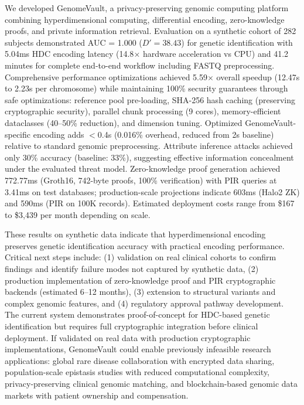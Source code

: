 \documentclass[11pt,letterpaper]{article}
\begin{document}
We developed GenomeVault, a privacy-preserving genomic computing platform combining hyperdimensional computing, differential encoding, zero-knowledge proofs, and private information retrieval. Evaluation on a synthetic cohort of 282 subjects demonstrated AUC = 1.000 ($D' = 38.43$) for genetic identification with 5.04ms HDC encoding latency (14.8$\times$ hardware acceleration vs CPU) and 41.2 minutes for complete end-to-end workflow including FASTQ preprocessing. Comprehensive performance optimizations achieved 5.59$\times$ overall speedup (12.47s to 2.23s per chromosome) while maintaining 100\% security guarantees through safe optimizations: reference pool pre-loading, SHA-256 hash caching (preserving cryptographic security), parallel chunk processing (9 cores), memory-efficient dataclasses (40--50\% reduction), and dimension tuning. Optimized GenomeVault-specific encoding adds $<$0.4s (0.016\% overhead, reduced from 2s baseline) relative to standard genomic preprocessing. Attribute inference attacks achieved only 30\% accuracy (baseline: 33\%), suggesting effective information concealment under the evaluated threat model. Zero-knowledge proof generation achieved 772.77ms (Groth16, 742-byte proofs, 100\% verification) with PIR queries at 3.41ms on test databases; production-scale projections indicate 603ms (Halo2 ZK) and 590ms (PIR on 100K records). Estimated deployment costs range from \$167 to \$3,439 per month depending on scale.

These results on synthetic data indicate that hyperdimensional encoding preserves genetic identification accuracy with practical encoding performance. Critical next steps include: (1) validation on real clinical cohorts to confirm findings and identify failure modes not captured by synthetic data, (2) production implementation of zero-knowledge proof and PIR cryptographic backends (estimated 6--12 months), (3) extension to structural variants and complex genomic features, and (4) regulatory approval pathway development. The current system demonstrates proof-of-concept for HDC-based genetic identification but requires full cryptographic integration before clinical deployment. If validated on real data with production cryptographic implementations, GenomeVault could enable previously infeasible research applications: global rare disease collaboration with encrypted data sharing, population-scale epistasis studies with reduced computational complexity, privacy-preserving clinical genomic matching, and blockchain-based genomic data markets with patient ownership and compensation.
\end{document}
